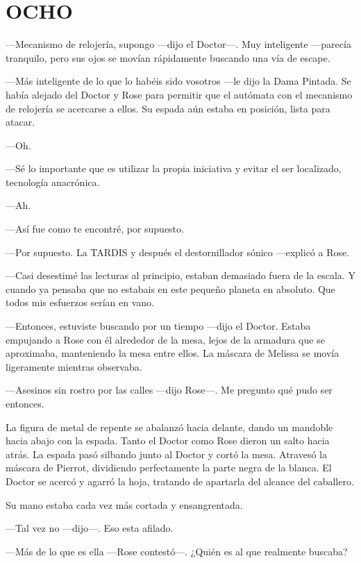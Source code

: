 \chapter*{OCHO}

{---Mecanismo de relojería, supongo ---dijo el Doctor---. Muy
	inteligente ---parecía tranquilo, pero sus ojos se movían rápidamente
buscando una vía de escape.}

{---Más inteligente de lo que lo habéis sido vosotros ---le dijo la Dama
	Pintada. Se había alejado del Doctor y Rose para permitir que el
	autómata con el mecanismo de relojería se acercarse a ellos. Su espada
aún estaba en posición, lista para atacar.}

{---Oh.}

{---Sé lo importante que es utilizar la propia iniciativa y evitar el
ser localizado, tecnología anacrónica.}

{---Ah.}

{---Así fue como te encontré, por supuesto.}

{---Por supuesto. La TARDIS y después el destornillador sónico
---explicó a Rose.}

{---Casi desestimé las lecturas al principio, estaban demasiado fuera de
	la escala. Y cuando ya pensaba que no estabais en este pequeño planeta
en absoluto. Que todos mis esfuerzos serían en vano.}

{---Entonces, estuviste buscando por un tiempo ---dijo el Doctor. Estaba
	empujando a Rose con él alrededor de la mesa, lejos de la armadura que
	se aproximaba, manteniendo la mesa entre ellos. La máscara de Melissa se
movía ligeramente mientras observaba.}

{---Asesinos sin rostro por las calles ---dijo Rose---. Me pregunto qué
pudo ser entonces.}

{La figura de metal de repente se abalanzó hacia delante, dando un
	mandoble hacia abajo con la espada. Tanto el Doctor como Rose dieron un
	salto hacia atrás. La espada pasó silbando junto al Doctor y cortó la
	mesa. Atravesó la máscara de Pierrot, dividiendo perfectamente la parte
	negra de la blanca. El Doctor se acercó y agarró la hoja, tratando de
apartarla del alcance del caballero.}

{Su mano estaba cada vez más cortada y ensangrentada.}

{---Tal vez no ---dijo---. Eso esta afilado.}

{---Más de lo que es ella ---Rose contestó---. ¿Quién es al que
realmente buscaba?}

